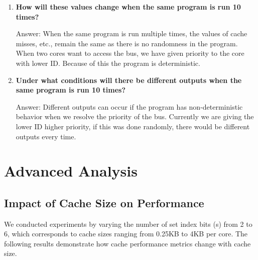 \documentclass[12pt,a4paper]{article}
\begin{document}
\begin{enumerate}
    
    
    
    \item \textbf{How will these values change when the same program is run 10 times?}
    
    Answer: When the same program is run multiple times, the values of cache misses, etc., remain the same as there is no randomness
    in the program. When two cores want to access the bus, we have given priority to the core with lower ID. Because of this the 
    program is deterministic. 

    \item \textbf{Under what conditions will there be different outputs when the same program is run 10 times?}

    Answer: Different outputs can occur if the program has non-deterministic behavior when we resolve the priority of the bus. Currently we are giving the lower ID higher priority, if this was done randomly, there would be different outputs every time.
\end{enumerate}

\section{Advanced Analysis}
\subsection{Impact of Cache Size on Performance}

We conducted experiments by varying the number of set index bits (s) from 2 to 6, which corresponds to cache sizes ranging from 0.25KB to 4KB per core. The following results demonstrate how cache performance metrics change with cache size.
\end{document}

